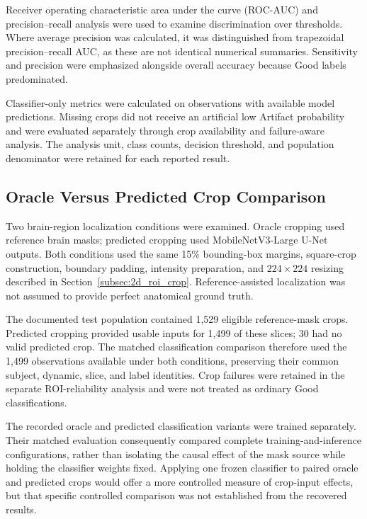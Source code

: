 Receiver operating characteristic area under the curve (ROC-AUC) and precision--recall analysis were used to examine discrimination over thresholds. Where average precision was calculated, it was distinguished from trapezoidal precision--recall AUC, as these are not identical numerical summaries. Sensitivity and precision were emphasized alongside overall accuracy because Good labels predominated.

Classifier-only metrics were calculated on observations with available model predictions. Missing crops did not receive an artificial low Artifact probability and were evaluated separately through crop availability and failure-aware analysis. The analysis unit, class counts, decision threshold, and population denominator were retained for each reported result.

\subsection{Oracle Versus Predicted Crop Comparison}
\label{subsec:cropping-comparison}

Two brain-region localization conditions were examined. Oracle cropping used reference brain masks; predicted cropping used MobileNetV3-Large U-Net outputs. Both conditions used the same 15\% bounding-box margins, square-crop construction, boundary padding, intensity preparation, and $224\times224$ resizing described in Section~\ref{subsec:2d_roi_crop}. Reference-assisted localization was not assumed to provide perfect anatomical ground truth.

The documented test population contained 1,529 eligible reference-mask crops. Predicted cropping provided usable inputs for 1,499 of these slices; 30 had no valid predicted crop. The matched classification comparison therefore used the 1,499 observations available under both conditions, preserving their common subject, dynamic, slice, and label identities. Crop failures were retained in the separate ROI-reliability analysis and were not treated as ordinary Good classifications.

The recorded oracle and predicted classification variants were trained separately. Their matched evaluation consequently compared complete training-and-inference configurations, rather than isolating the causal effect of the mask source while holding the classifier weights fixed. Applying one frozen classifier to paired oracle and predicted crops would offer a more controlled measure of crop-input effects, but that specific controlled comparison was not established from the recovered results.

